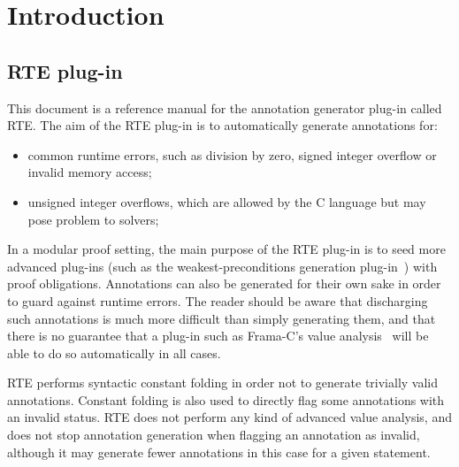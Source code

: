 \newcommand{\bropen}{\mbox{\tt [}}
\newcommand{\brclose}{\mbox{\tt ]}}
\newcommand{\cbopen}{\mbox{\tt \{}}
\newcommand{\cbclose}{\mbox{\tt \}}}
\newcommand{\cnn}{\mbox{ISO C99}}
\newcommand{\optsigned}{\mbox{\lstinline|-rte-signed|}}
\newcommand{\optnodowncast}{\mbox{\lstinline|-rte-no-downcast|}}
\newcommand{\rte}{\textsf{RTE}\xspace}
\newcommand{\framac}{\textsf{Frama-C}\xspace}
\newcommand{\acsl}{\textsf{ACSL}\xspace}
\newcommand{\gcc}{\textsf{Gcc}\xspace}
\newcommand{\clang}{\textsf{Clang}\xspace}

\tableofcontents

\chapter{Introduction}\label{introduction}
\vspace{1cm}

\section{\rte{} plug-in}

This document is a reference manual for the annotation generator plug-in called
\rte{}.  The aim of the \rte{} plug-in is to automatically generate annotations
for:

\begin{itemize}
\item common runtime errors, such as division by zero, signed integer overflow
  or invalid memory access;
\item unsigned integer overflows, which are allowed by the C language but may
  pose problem to solvers;
\end{itemize}

In a modular proof setting, the main purpose of the \rte{} plug-in is to seed
more advanced plug-ins (such as the weakest-preconditions generation
plug-in~\cite{framacwp}) with proof obligations.  Annotations can also be
generated for their own sake in order to guard against runtime errors.  The
reader should be aware that discharging such annotations is much more difficult
than simply generating them, and that there is no guarantee that a plug-in such
as Frama-C's value analysis~\cite{framacvalueanalysis} will be able to do so
automatically in all cases.

\rte{} performs syntactic constant folding in order not to generate trivially
valid annotations.  Constant folding is also used to directly flag some
annotations with an invalid status.  \rte{} does not perform any kind of
advanced value analysis, and does not stop annotation generation when flagging
an annotation as invalid, although it may generate fewer annotations in this
case for a given statement.

